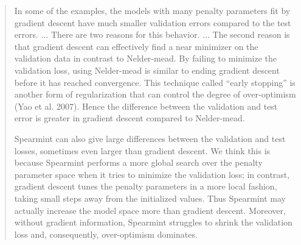 \documentclass[]{article}
\begin{document}
\begin{enumerate}
		\begin{quote}
			In some of the examples, the models with many penalty parameters fit by gradient descent have much smaller validation errors compared to the test errors. ... There are two reasons for this behavior. ... The second reason is that gradient descent can effectively find a near minimizer on the validation data in contrast to Nelder-mead. By failing to minimize the validation loss, using Nelder-mead is similar to ending gradient descent before it has reached convergence. This technique called ``early stopping'' is another form of regularization that can control the degree of over-optimism (Yao et al. 2007). Hence the difference between the validation and test error is greater in gradient descent compared to Nelder-mead.
			
			Spearmint can also give large differences between the validation and test losses, sometimes even larger than gradient descent.
			We think this is because Spearmint performs a more global search over the penalty parameter space when it tries to minimize the validation loss; in contrast, gradient descent tunes the penalty parameters in a more local fashion, taking small steps away from the initialized values.
			Thus Spearmint may actually increase the model space more than gradient descent.
			Moreover, without gradient information, Spearmint struggles to shrink the validation loss and, consequently, over-optimism dominates.
		\end{quote}
		
		\end{enumerate}
\end{document}
